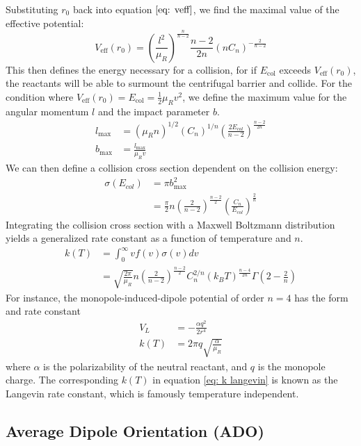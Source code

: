 Substituting $r_0$ back into equation $\ref{eq: veff}$, we find the maximal value of the effective potential:
\begin{equation}
    V_{\mathrm{eff}}(r_0) = \left(\frac{l^2}{\mu_R}\right)^{\frac{n}{n-2}} \frac{n-2}{2n}(n C_n)^{-\frac{2}{n-2}}
\end{equation}
This then defines the energy necessary for a collision, for if $E_{\mathrm{col}}$ exceeds $V_{\mathrm{eff}}(r_0)$, the reactants will be able to surmount the centrifugal barrier and collide. For the condition where $V_{\mathrm{eff}}(r_0) = E_{\mathrm{col}} = \frac{1}{2}\mu_R v^2$, we define the maximum value for the angular momentum $l$ and the impact parameter $b$.
\begin{align*}
    l_{\max} & = (\mu_R n)^{1/2}(C_n)^{1/n} \left(\frac{2 E_{col}}{n-2}\right)^{\frac{n-2}{2n}} \\
    b_{\max} & = \frac{l_{\max}}{\mu_R v}
\end{align*}
We can then define a collision cross section dependent on the collision energy:
\begin{align*}
    \sigma(E_{col}) & = \pi b^2_{\max} \\
    & = \frac{\pi}{2} n \left(\frac{2}{n-2}\right)^{\frac{n-2}{2}} \left(\frac{C_n}{E_{col}}\right)^{\frac{2}{n}}
\end{align*}
Integrating the collision cross section with a Maxwell Boltzmann distribution yields a generalized rate constant as a function of temperature and $n$.
\begin{align}
    k(T) & = \int_0^{\infty} v f(v) \sigma(v) dv \label{eq: k int} \\
    & = \sqrt{\frac{2 \pi}{\mu_R}}n\left(\frac{2}{n-2}\right)^{\frac{n-2}{2}}C_n^{2/n}(k_B T)^{\frac{n-4}{2n}}\Gamma\left(2-\frac{2}{n}\right) \label{eq: k(T)}
\end{align}
For instance, the monopole-induced-dipole potential of order $n=4$ has the form and rate constant
\begin{align}
	V_L & = -\frac{\alpha q^2}{2r^4} \label{eq: V_L} \\
	k(T) & = 2\pi q \sqrt{\frac{\alpha}{\mu_R}} \label{eq: k langevin}
\end{align}
where $\alpha$ is the polarizability of the neutral reactant, and $q$ is the monopole charge. The corresponding $k(T)$ in equation \ref{eq: k langevin} is known as the Langevin rate constant, which is famously temperature independent.

\subsection{Average Dipole Orientation (ADO)}


